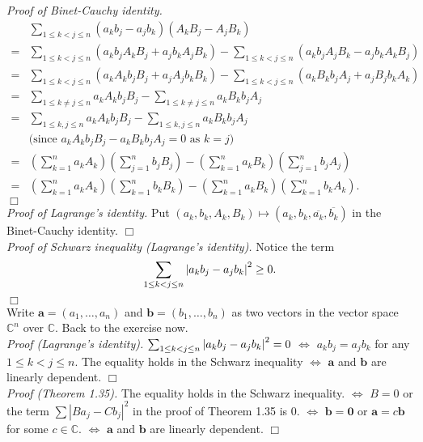 \documentclass{article}
\begin{document}
\emph{Proof of Binet-Cauchy identity.}
\begin{align*}
&\sum_{1 \leq k < j \leq n}
(a_k b_j - a_j b_k)(A_k B_j - A_j B_k) \\
= &\sum_{1 \leq k < j \leq n}
(a_k b_j A_k B_j + a_j b_k A_j B_k)
- \sum_{1 \leq k < j \leq n}
(a_k b_j A_j B_k - a_j b_k A_k B_j) \\
= &\sum_{1 \leq k < j \leq n}
(a_k A_k b_j B_j + a_j A_j b_k B_k)
- \sum_{1 \leq k < j \leq n}
(a_k B_k b_j A_j + a_j B_j b_k A_k) \\
= &\sum_{1 \leq k \neq j \leq n} a_k A_k b_j B_j
 - \sum_{1 \leq k \neq j \leq n} a_k B_k b_j A_j \\
= &\sum_{1 \leq k, j \leq n} a_k A_k b_j B_j
 - \sum_{1 \leq k, j \leq n} a_k B_k b_j A_j \\
  & \text{(since $a_k A_k b_j B_j - a_k B_k b_j A_j = 0$ as $k = j$)} \\
= &\left( \sum_{k=1}^{n} a_k A_k \right)\left( \sum_{j=1}^{n} b_j B_j \right)
- \left( \sum_{k=1}^{n} a_k B_k \right)\left( \sum_{j=1}^{n} b_j A_j \right) \\
= &\left( \sum_{k=1}^{n} a_k A_k \right)\left( \sum_{k=1}^{n} b_k B_k \right)
- \left( \sum_{k=1}^{n} a_k B_k \right)\left( \sum_{k=1}^{n} b_k A_k \right).
\end{align*}
$\Box$ \\

\emph{Proof of Lagrange's identity.}
Put $(a_k, b_k, A_k, B_k) \mapsto (a_k, b_k, \overline{a_k}, \overline{b_k})$
in the Binet-Cauchy identity.
$\Box$ \\

\emph{Proof of Schwarz inequality (Lagrange's identity).}
Notice the term $$\sum_{1 \leq k < j \leq n} \abs{ a_k b_j - a_j b_k }^2 \geq 0.$$
$\Box$ \\

Write $\mathbf{a} = (a_1, \ldots, a_n)$ and $\mathbf{b} = (b_1, \ldots, b_n)$
as two vectors in the vector space $\mathbb{C}^n$ over $\mathbb{C}$.
Back to the exercise now. \\

\emph{Proof (Lagrange's identity).}
$\sum_{1 \leq k < j \leq n} \abs{ a_k b_j - a_j b_k }^2 = 0$
$\Longleftrightarrow$
$a_k b_j = a_j b_k$ for any $1 \leq k < j \leq n$.
The equality holds in the Schwarz inequality
$\Longleftrightarrow$
$\mathbf{a}$ and $\mathbf{b}$ are linearly dependent.
$\Box$ \\

\emph{Proof (Theorem 1.35).}
The equality holds in the Schwarz inequality.
$\Longleftrightarrow$
$B = 0$ or
the term $\sum |B a_j - C b_j|^2$ in the proof of Theorem 1.35 is $0$.
$\Longleftrightarrow$
$\mathbf{b} = \mathbf{0}$ or $\mathbf{a} = c\mathbf{b}$ for some $c \in \mathbb{C}$.
$\Longleftrightarrow$
$\mathbf{a}$ and $\mathbf{b}$ are linearly dependent.
$\Box$ \\\\
\end{document}
